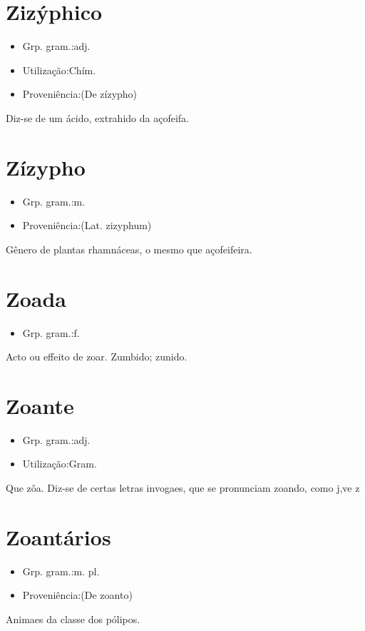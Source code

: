 \section{Zizýphico}
\begin{itemize}
\item {Grp. gram.:adj.}
\end{itemize}
\begin{itemize}
\item {Utilização:Chím.}
\end{itemize}
\begin{itemize}
\item {Proveniência:(De \textunderscore zízypho\textunderscore )}
\end{itemize}
Diz-se de um ácido, extrahido da açofeifa.
\section{Zízypho}
\begin{itemize}
\item {Grp. gram.:m.}
\end{itemize}
\begin{itemize}
\item {Proveniência:(Lat. \textunderscore zizyphum\textunderscore )}
\end{itemize}
Gênero de plantas rhamnáceas, o mesmo que \textunderscore açofeifeira\textunderscore .
\section{Zoada}
\begin{itemize}
\item {Grp. gram.:f.}
\end{itemize}
Acto ou effeito de zoar.
Zumbido; zunido.
\section{Zoante}
\begin{itemize}
\item {Grp. gram.:adj.}
\end{itemize}
\begin{itemize}
\item {Utilização:Gram.}
\end{itemize}
Que zôa.
Diz-se de certas letras invogaes, que se pronunciam zoando, como \textunderscore j\textunderscore ,\textunderscore v\textunderscore  e \textunderscore z\textunderscore 
\section{Zoantários}
\begin{itemize}
\item {Grp. gram.:m. pl.}
\end{itemize}
\begin{itemize}
\item {Proveniência:(De \textunderscore zoanto\textunderscore )}
\end{itemize}
Animaes da classe dos pólipos.
